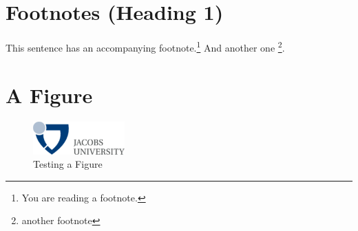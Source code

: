 \documentclass{article}
\begin{document}
\section{Footnotes (Heading 1)}

This sentence has an accompanying footnote.\footnote{You are reading a footnote.}   And
another one \footnote{another footnote}. 


\section{A Figure}

\begin{figure}[ht]
  \includegraphics[width=100pt]{logo}
  \caption{Testing a Figure}
\end{figure}





\end{document}
